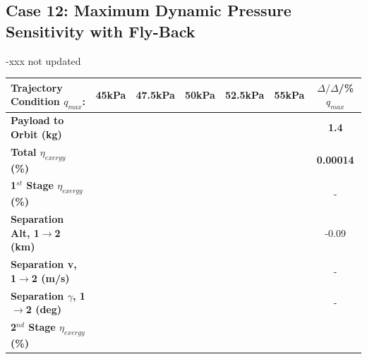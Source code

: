 \subsection{Case 12: Maximum Dynamic Pressure Sensitivity with Fly-Back}
-xxx not updated
\begin{table}[ht]%
	\centering
	\begin{tabular}{l c c c c c c} 
		\hline \textbf{Trajectory Condition}   \qquad  $q_{max}$:
		&45kPa
		&47.5kPa
		&50kPa
		&52.5kPa
		&55kPa
		& $\Delta/\Delta$/\%$q_{max}$
			\\
			\hline \textbf{Payload to Orbit (kg)}
			& \textbf{\PayloadToOrbitqForty}
			& \textbf{\PayloadToOrbitqFortyFive}
			& \textbf{\PayloadToOrbitqStandard}
			& \textbf{\PayloadToOrbitqFiftyFive}
			& \textbf{\PayloadToOrbitqSixty}
			&\textbf{1.4}
			\\
			\textbf{Total $\eta_{exergy}$ (\%)}
			& \textbf{\totalExergyEffqForty}
			& \textbf{\totalExergyEffqFortyFive}
			& \textbf{\totalExergyEffqStandard}
			& \textbf{\totalExergyEffqFiftyFive}
			& \textbf{\totalExergyEffqSixty}
			& \textbf{0.00014}
			\\
			\hline 
			\textbf{1$^{st}$ Stage $\eta_{exergy}$ (\%)}
			& \textbf{\firstExergyEffqForty}
			& \textbf{\firstExergyEffqFortyFive}
			& \textbf{\firstExergyEffqStandard}
			& \textbf{\firstExergyEffqFiftyFive}
			& \textbf{\firstExergyEffqSixty}
			& -
			\\
			\textbf{Separation Alt, 1$\rightarrow$2 (km)}
			& \firstsecondSeparationAltqForty
			& \firstsecondSeparationAltqFortyFive
			& \firstsecondSeparationAltqStandard
			& \firstsecondSeparationAltqFiftyFive
			& \firstsecondSeparationAltqSixty
			&-0.09
			\\
			\textbf{Separation v, 1$\rightarrow$2 (m/s)}
			& \firstsecondSeparationvqForty
			& \firstsecondSeparationvqFortyFive
			& \firstsecondSeparationvqStandard
			& \firstsecondSeparationvqFiftyFive
			& \firstsecondSeparationvqSixty
			& -
			\\
			\textbf{Separation $\gamma$, 1$\rightarrow$2 (deg)}
			& \firstsecondSeparationgammaqForty
			& \firstsecondSeparationgammaqFortyFive
			& \firstsecondSeparationgammaqStandard
			& \firstsecondSeparationgammaqFiftyFive
			& \firstsecondSeparationgammaqSixty
			& -
			\\
			\hline 
			\textbf{2$^{nd}$ Stage $\eta_{exergy}$ (\%)}
			& \textbf{\secondExergyEffqForty}
			& \textbf{\secondExergyEffqFortyFive}
			& \textbf{\secondExergyEffqStandard}
			& \textbf{\secondExergyEffqFiftyFive}

\end{tabular}
\end{table}
